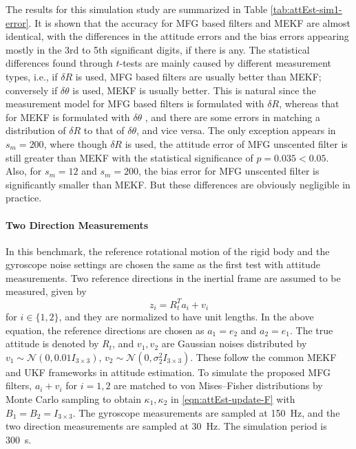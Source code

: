The results for this simulation study are summarized in Table \ref{tab:attEst-sim1-error}.
It is shown that the accuracy for MFG based filters and MEKF are almost identical, with the differences in the attitude errors and the bias errors appearing mostly in the 3rd to 5th significant digits, if there is any.
The statistical differences found through $t$-tests are mainly caused by different measurement types, i.e., if $\delta R$ is used, MFG based filters are usually better than MEKF; conversely if $\delta\theta$ is used, MEKF is usually better.
This is natural since the measurement model for MFG based filters is formulated with $\delta R$, whereas that for MEKF is formulated with $\delta\theta$ \cite{lefferts1982kalman}, and there are some errors in matching a distribution of $\delta R$ to that of $\delta\theta$, and vice versa.
The only exception appears in $s_m=200$, where though $\delta R$ is used, the attitude error of MFG unscented filter is still greater than MEKF with the statistical significance of $p=0.035<0.05$.
Also, for $s_m=12$ and $s_m=200$, the bias error for MFG unscented filter is significantly smaller than MEKF.
But these differences are obviously negligible in practice.

\paragraph{Two Direction Measurements}

In this benchmark, the reference rotational motion of the rigid body and the gyroscope noise settings are chosen the same as the first test with attitude measurements.
Two reference directions in the inertial frame are assumed to be measured, given by
\begin{equation}
	z_{i} = R_t^T a_{i} + v_{i}
\end{equation}
for $i\in\{1,2\}$, and they are normalized to have unit lengths.
In the above equation, the reference directions are chosen as $a_1=e_2$ and $a_2=e_1$.
The true attitude is denoted by $R_t$, and $v_1,v_2$ are Gaussian noises distributed by $v_1 \sim \mathcal{N}(0,0.01I_{3\times3})$, $v_2 \sim \mathcal{N}(0,\sigma_2^2I_{3\times3})$. 
These follow the common MEKF and UKF frameworks in attitude estimation.
To simulate the proposed MFG filters, $a_i+v_i$ for $i=1,2$ are matched to von Mises--Fisher distributions by Monte Carlo sampling to obtain $\kappa_1,\kappa_2$ in \eqref{eqn:attEst-update-F} with $B_1 = B_2 = I_{3\times 3}$.
The gyroscope measurements are sampled at \SI{150}{\hertz}, and the two direction measurements are sampled at \SI{30}{\hertz}.
The simulation period is \SI{300}{\second}.

